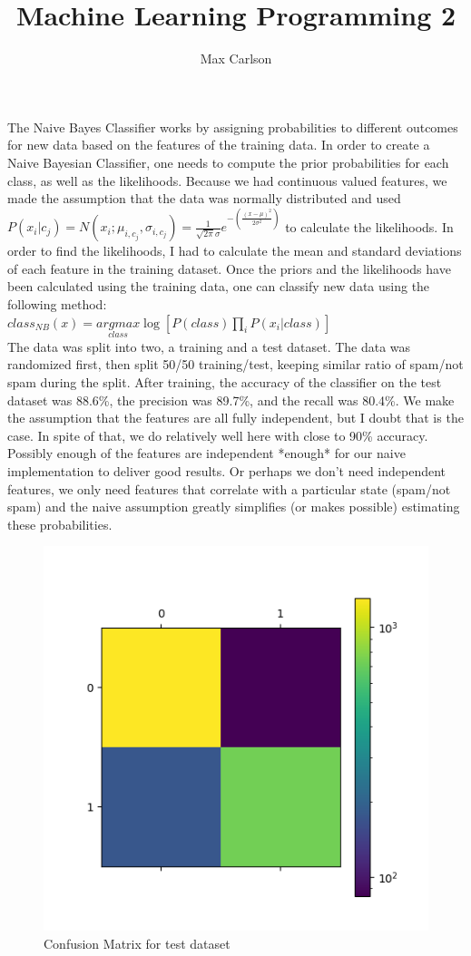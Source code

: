 \documentclass{article}
\author{Max Carlson}
\title{Machine Learning Programming 2}
\begin{document}
	\maketitle
	
	The Naive Bayes Classifier works by assigning probabilities to different outcomes for new data based on the features of the training data. In order to create a Naive Bayesian Classifier, one needs to compute the prior probabilities for each class, as well as the likelihoods. Because we had continuous valued features, we made the assumption that the data was normally distributed and used $P(x_i|c_j) = N(x_i;\mu _{i,c_j},\sigma_{i,c_j})=\frac{1}{\sqrt{2\pi}\sigma}e^{-(\frac{(x-\mu)^2}{2\sigma^2})}$ to calculate the likelihoods. In order to find the likelihoods, I had to calculate the mean and standard deviations of each feature in the training dataset. Once the priors and the likelihoods have been calculated using the training data, one can classify new data using the following method: \\
	
	$class_{NB}(x)=\underset{class}{argmax}\log[P(class)\prod_{i}^{}P(x_i|class)]$
	\\
	
	The data was split into two, a training and a test dataset. The data was randomized first, then split 50/50 training/test, keeping similar ratio of spam/not spam during the split. After training, the accuracy of the classifier on the test dataset was 88.6\%, the precision was 89.7\%, and the recall was 80.4\%. We make the assumption that the features are all fully independent, but I doubt that is the case. In spite of that, we do relatively well here with close to 90\% accuracy. Possibly enough of the features are independent *enough* for our naive implementation to deliver good results. Or perhaps we don't need independent features, we only need features that correlate with a particular state (spam/not spam) and the naive assumption greatly simplifies (or makes possible) estimating these probabilities.
	
	
	\begin{figure}[]
		\begin{center}
			\includegraphics[]{confusion.png}		
			\caption{Confusion Matrix for test dataset}	\label{fig:xray}
		\end{center}
	\end{figure}
\end{document}
